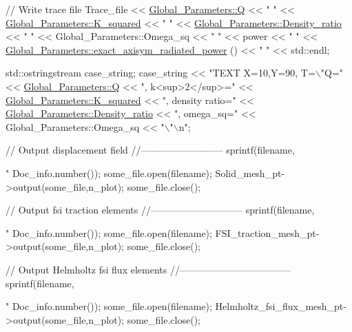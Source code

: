 \begin{DoxyCodeInclude}
{ \textcolor{comment}{// Write trace file}
 Trace\_file << \hyperlink{namespaceGlobal__Parameters_a7814fddf663e56168174a42d2cd6b4c1}{Global\_Parameters::Q} << \textcolor{stringliteral}{" "} 
            << \hyperlink{namespaceGlobal__Parameters_a91a3fa265abaf9e724c668ee800ffb29}{Global\_Parameters::K\_squared} << \textcolor{stringliteral}{" "}
            << \hyperlink{namespaceGlobal__Parameters_a517d4c31b8bce6563c2f605266dd9679}{Global\_Parameters::Density\_ratio} << \textcolor{stringliteral}{" "}
            << Global\_Parameters::Omega\_sq << \textcolor{stringliteral}{" "}
            << power << \textcolor{stringliteral}{" "} 
            << \hyperlink{namespaceGlobal__Parameters_a79131fd1bf3eb1ab080c21c2d98a92d5}{Global\_Parameters::exact\_axisym\_radiated\_power}
      () << \textcolor{stringliteral}{" "} 
            << std::endl;
  
 std::ostringstream case\_string;
 case\_string << \textcolor{stringliteral}{"TEXT X=10,Y=90, T=\(\backslash\)"Q="} 
             <<  \hyperlink{namespaceGlobal__Parameters_a7814fddf663e56168174a42d2cd6b4c1}{Global\_Parameters::Q} 
             << \textcolor{stringliteral}{",  k<sup>2</sup>="}
             <<  \hyperlink{namespaceGlobal__Parameters_a91a3fa265abaf9e724c668ee800ffb29}{Global\_Parameters::K\_squared}
             << \textcolor{stringliteral}{",  density ratio="}
             <<  \hyperlink{namespaceGlobal__Parameters_a517d4c31b8bce6563c2f605266dd9679}{Global\_Parameters::Density\_ratio}
             << \textcolor{stringliteral}{",  omega\_sq="}
             <<  Global\_Parameters::Omega\_sq
             << \textcolor{stringliteral}{"\(\backslash\)"\(\backslash\)n"};


 \textcolor{comment}{// Output displacement field}
 \textcolor{comment}{//--------------------------}
 sprintf(filename,\textcolor{stringliteral}{"%
         Doc\_info.number());
 some\_file.open(filename);
 Solid\_mesh\_pt->output(some\_file,n\_plot);
 some\_file.close();


 \textcolor{comment}{// Output fsi traction elements}
 \textcolor{comment}{//----------------------------- }
 sprintf(filename,\textcolor{stringliteral}{"%
         Doc\_info.number());
 some\_file.open(filename);
 FSI\_traction\_mesh\_pt->output(some\_file,n\_plot);
 some\_file.close();


 \textcolor{comment}{// Output Helmholtz fsi flux elements}
 \textcolor{comment}{//----------------------------------- }
 sprintf(filename,\textcolor{stringliteral}{"%
         Doc\_info.number());
 some\_file.open(filename);
 Helmholtz\_fsi\_flux\_mesh\_pt->output(some\_file,n\_plot);
 some\_file.close();


}}}}
\end{DoxyCodeInclude}
